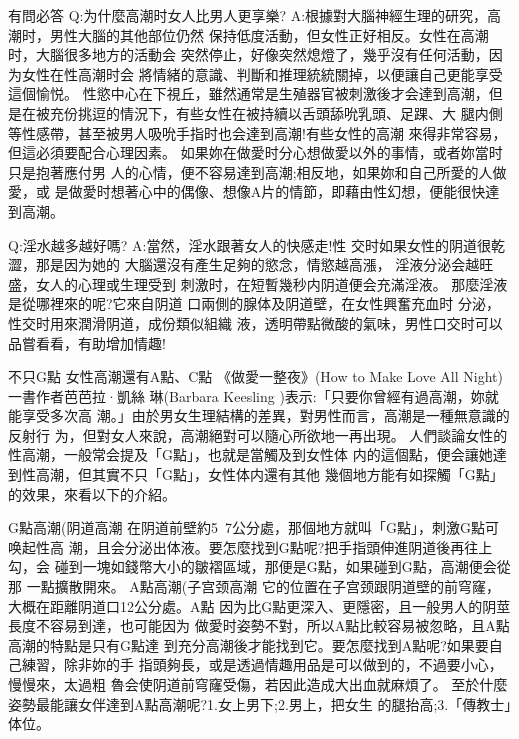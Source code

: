 \documentclass[12pt,UTF8]{ctexbook}
\begin{document}
有問必答
Q:为什麼高潮时女人比男人更享樂?
A:根據對大腦神經生理的研究，高潮时，男性大腦的其他部位仍然
保持低度活動，但女性正好相反。女性在高潮时，大腦很多地方的活動会
突然停止，好像突然熄燈了，幾乎沒有任何活動，因为女性在性高潮时会
將情緒的意識、判斷和推理統統關掉，以便讓自己更能享受這個愉悦。
性慾中心在下視丘，雖然通常是生殖器官被刺激後才会達到高潮，但
是在被充份挑逗的情況下，有些女性在被持續以舌頭舔吮乳頭、足踝、大
腿内側等性感帶，甚至被男人吸吮手指时也会達到高潮!有些女性的高潮
來得非常容易，但這必須要配合心理因素。
如果妳在做愛时分心想做愛以外的事情，或者妳當时只是抱著應付男
人的心情，便不容易達到高潮;相反地，如果妳和自己所愛的人做愛，或
是做愛时想著心中的偶像、想像A片的情節，即藉由性幻想，便能很快達
到高潮。

Q:淫水越多越好嗎?
A:當然，淫水跟著女人的快感走!性
交时如果女性的阴道很乾澀，那是因为她的
大腦還沒有產生足夠的慾念，情慾越高漲，
淫液分泌会越旺盛，女人的心理或生理受到
刺激时，在短暫幾秒内阴道便会充滿淫液。
那麼淫液是從哪裡來的呢?它來自阴道
口兩側的腺体及阴道壁，在女性興奮充血时
分泌，性交时用來潤滑阴道，成份類似組織
液，透明帶點微酸的氣味，男性口交时可以
品嘗看看，有助增加情趣!

不只G點
女性高潮還有A點、C點
《做愛一整夜》(How to Make Love All Night)一書作者芭芭拉·凱絲
琳(Barbara Keesling )表示:「只要你曾經有過高潮，妳就能享受多次高
潮。」由於男女生理結構的差異，對男性而言，高潮是一種無意識的反射行
为，但對女人來說，高潮絕對可以隨心所欲地一再出現。
人們談論女性的性高潮，一般常会提及「G點」，也就是當觸及到女性体
内的這個點，便会讓她達到性高潮，但其實不只「G點」，女性体内還有其他
幾個地方能有如探觸「G點」的效果，來看以下的介紹。

G點高潮(阴道高潮
在阴道前壁約5~7公分處，那個地方就叫「G點」，刺激G點可唤起性高
潮，且会分泌出体液。要怎麼找到G點呢?把手指頭伸進阴道後再往上勾，会
碰到一塊如錢幣大小的皺褶區域，那便是G點，如果碰到G點，高潮便会從那
一點擴散開來。
A點高潮(子宫颈高潮
它的位置在子宫颈跟阴道壁的前穹窿，大概在距離阴道口12公分處。A點
因为比G點更深入、更隱密，且一般男人的阴莖長度不容易到達，也可能因为
做愛时姿勢不對，所以A點比較容易被忽略，且A點高潮的特點是只有G點達
到充分高潮後才能找到它。要怎麼找到A點呢?如果要自己練習，除非妳的手
指頭夠長，或是透過情趣用品是可以做到的，不過要小心，慢慢來，太過粗
魯会使阴道前穹窿受傷，若因此造成大出血就麻煩了。
至於什麼姿勢最能讓女伴達到A點高潮呢?1.女上男下;2.男上，把女生
的腿抬高;3.「傳教士」体位。
\end{document}
